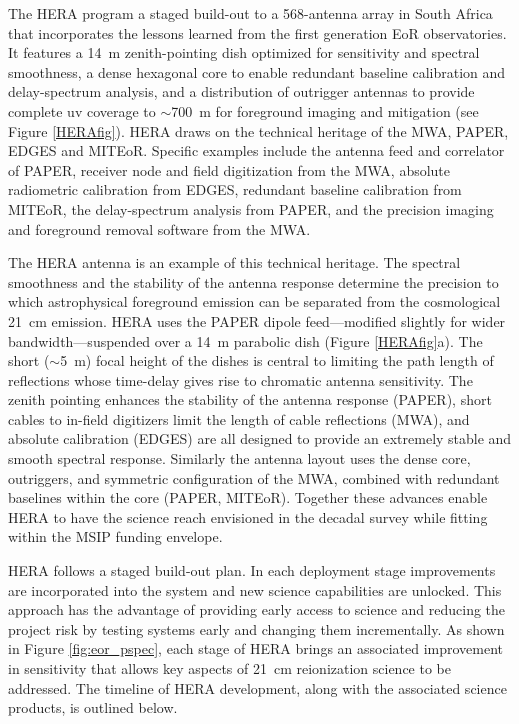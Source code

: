 \documentclass[preprint]{aastex}
\begin{document}
The HERA program a staged build-out to a 568-antenna array in South Africa that
incorporates the lessons learned from the first generation EoR observatories.
It features a 14~m zenith-pointing dish optimized for sensitivity and spectral
smoothness, a dense hexagonal core to enable redundant baseline calibration and
delay-spectrum analysis, and a distribution of outrigger antennas to provide
complete uv coverage to $\sim$700~m for foreground imaging and mitigation (see
Figure \ref{HERAfig}). HERA draws on the technical heritage of the MWA, PAPER,
EDGES and MITEoR. Specific examples include the antenna feed and correlator of
PAPER, receiver node and field digitization from the MWA, absolute radiometric
calibration from EDGES, redundant baseline calibration from MITEoR, the
delay-spectrum analysis from PAPER, and the precision imaging and foreground
removal software from the MWA.


The HERA antenna is an example of this technical heritage. The spectral
smoothness and the stability of the antenna response determine the precision to
which astrophysical foreground emission can be separated from the cosmological
21~cm emission. HERA uses the PAPER dipole feed---modified slightly for wider
bandwidth---suspended over a 14~m parabolic dish (Figure \ref{HERAfig}a). The
short ($\sim$5~m) focal height of the dishes is central to limiting the path
length of reflections whose time-delay gives rise to chromatic antenna
sensitivity. The zenith pointing enhances the stability of the antenna response
(PAPER), short cables to in-field digitizers limit the length of cable
reflections (MWA), and absolute calibration (EDGES) are all designed to provide
an extremely stable and smooth spectral response. Similarly the antenna layout
uses the dense core, outriggers, and symmetric configuration of the MWA,
combined with redundant baselines within the core (PAPER, MITEoR). Together
these advances enable HERA to have the science reach envisioned in the decadal
survey while fitting within the MSIP funding envelope.


HERA follows a staged build-out plan.  In
each deployment stage improvements are incorporated into the system and new
science capabilities are unlocked.  This approach has the advantage of
providing early access to science and reducing the project risk by testing systems
early and changing them incrementally.  As shown in Figure \ref{fig:eor_pspec}, each
stage of HERA brings an associated improvement in sensitivity that allows key
aspects of 21~cm reionization science to be addressed.  The timeline of HERA
development, along with the associated science products, is outlined below. 
\end{document}
